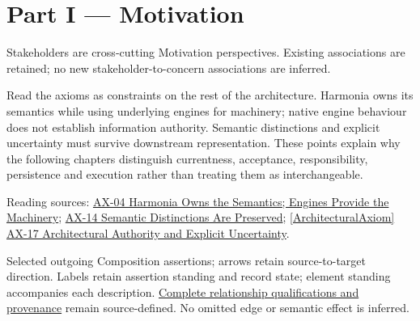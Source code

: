 \part*{Part I — Motivation}
\label{navigation:I}
Stakeholders are cross-cutting Motivation perspectives. Existing associations are retained; no new stakeholder-to-concern associations are inferred.\par
Read the axioms as constraints on the rest of the architecture. Harmonia owns its semantics while using underlying engines for machinery; native engine behaviour does not establish information authority. Semantic distinctions and explicit uncertainty must survive downstream representation. These points explain why the following chapters distinguish currentness, acceptance, responsibility, persistence and execution rather than treating them as interchangeable.

{\small Reading sources: \hyperref[element:54508cda80484a6caf95b901780eaf7d]{AX-04 Harmonia Owns the Semantics; Engines Provide the Machinery}; \hyperref[element:d3fc6025dc7646d1b2020b51f7a44bfa]{AX-14 Semantic Distinctions Are Preserved}; \hyperref[element:8882573df7ce43c6bc0f66da0a676139]{[ArchitecturalAxiom] AX-17 Architectural Authority and Explicit Uncertainty}.}\par
\begin{center}\end{center}
{\small Selected outgoing Composition assertions; arrows retain source-to-target direction. Labels retain assertion standing and record state; element standing accompanies each description. \href{structure.json}{Complete relationship qualifications and provenance} remain source-defined. No omitted edge or semantic effect is inferred.}\par
